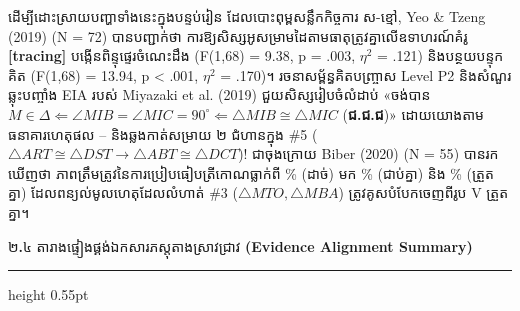 \documentclass[a4paper,12pt]{article}
\newcommand{\en}[1]{{\TimesEn #1}}
\newcommand{\enbf}[1]{{\TimesEn\textbf{#1}}}
\newcommand{\cnum}[1]{{\TimesEn\fontsize{10.5pt}{12pt}\selectfont\ding{\numexpr181+#1\relax}}}
\newcommand{\tri}[1]{\ensuremath{\triangle #1}}
\newcommand{\ang}[1]{\ensuremath{\angle #1}}
\newcommand{\cg}{\ensuremath{\cong}}
\newcommand{\subsectitle}[1]{{\muol\fontsize{11pt}{14.5pt}\selectfont #1}}
\newcommand{\subsec}[1]{%
  \Needspace{1.6cm}%
  \vspace{4pt}%
  \subsectitle{#1}\par%
  \vspace{-2pt}%
  {\color{black}\hrule height 0.55pt}%
  \vspace{3.5pt}%
}
\begin{document}
ដើម្បីដោះស្រាយបញ្ហាទាំងនេះក្នុងបន្ទប់រៀន ដែលបោះពុម្ពសន្លឹកកិច្ចការ ស-ខ្មៅ, \en{Yeo \& Tzeng (2019)} (\en{N = 72}) បានបញ្ជាក់ថា ការឱ្យសិស្សអូសម្រាមដៃតាមធាតុត្រូវគ្នាលើឧទាហរណ៍គំរូ \en{\textbf{[tracing]}} បង្កើនពិន្ទុផ្ទេរចំណេះដឹង (\en{F(1,68) = 9.38, p = .003, $\eta^2$ = .121}) និងបន្ថយបន្ទុកគិត (\en{F(1,68) = 13.94, p < .001, $\eta^2$ = .170})។ រចនាសម្ព័ន្ធគិតបញ្ច្រាស \en{Level P2} និងសំណួរឆ្លុះបញ្ចាំង \en{EIA} របស់ \en{Miyazaki et al. (2019)} ជួយសិស្សរៀបចំលំដាប់ «ចង់បាន $M \in \Delta \Leftarrow \ang{MIB}=\ang{MIC}=90^\circ \Leftarrow \tri{MIB}\cg\tri{MIC}$ (\textbf{ជ.ជ.ជ})» ដោយយោងតាមធនាគារហេតុផល \cnum{1}--\cnum{5} និងឆ្លងកាត់សម្រាយ ២ ជំហានក្នុង \en{\#5} ($\tri{ART}\cg\tri{DST} \to \tri{ABT}\cg\tri{DCT}$)! ជាចុងក្រោយ \en{Biber (2020)} (\en{N = 55}) បានរកឃើញថា ភាពត្រឹមត្រូវនៃការប្រៀបធៀបត្រីកោណធ្លាក់ពី \en{92\%} (ដាច់) មក \en{82\%} (ជាប់គ្នា) និង \en{53\%} (ត្រួតគ្នា) ដែលពន្យល់មូលហេតុដែលលំហាត់ \en{\#3} ($\tri{MTO}, \tri{MBA}$) ត្រូវគូសបំបែកចេញពីរូប \en{V} ត្រួតគ្នា។

\subsec{២\enbf{.}៤ តារាងផ្ទៀងផ្គង់ឯកសារភស្តុតាងស្រាវជ្រាវ \enbf{(Evidence Alignment Summary)}}
\end{document}
